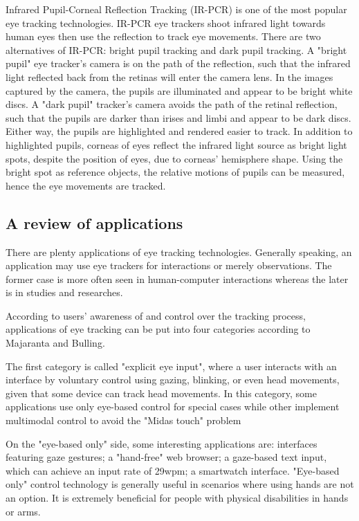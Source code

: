 \documentclass[english]{tktltiki}
\begin{document}
Infrared Pupil-Corneal Reflection Tracking (IR-PCR) is one of the most popular eye tracking technologies. IR-PCR eye trackers shoot infrared light towards human eyes then use the reflection to track eye movements. There are two alternatives of IR-PCR: bright pupil tracking and dark pupil tracking. A "bright pupil" eye tracker's camera is on the path of the reflection, such that the infrared light reflected back from the retinas will enter the camera lens. In the images captured by the camera, the pupils are illuminated and appear to be bright white discs. A "dark pupil" tracker's camera avoids the path of the retinal reflection, such that the pupils are darker than irises and limbi and appear to be dark discs. Either way, the pupils are highlighted and rendered easier to track. In addition to highlighted pupils, corneas of eyes reflect the infrared light source as bright light spots, despite the position of eyes, due to corneas' hemisphere shape. Using the bright spot as reference objects, the relative motions of pupils can be measured, hence the eye movements are tracked.


\subsection{A review of applications}

There are plenty applications of eye tracking technologies. Generally speaking, an application may use eye trackers for interactions or merely observations. The former case is more often seen in human-computer interactions whereas the later is in studies and researches. 

According to users' awareness of and control over the tracking process, applications of eye tracking can be put into four categories according to Majaranta and Bulling.\cite{majaranta14}

The first category is called "explicit eye input", where a user interacts with an interface by voluntary control using gazing, blinking, or even head movements, given that some device can track head movements. In this category, some applications use only eye-based control for special cases while other implement multimodal control to avoid the "Midas touch" problem \cite{Velichkovsky97}

On the "eye-based only" side, some interesting applications are: interfaces featuring gaze gestures\cite{Drewes:2007:ICU:1778331.1778385}\cite{Ohno:1998:FEG:786112.786297}; a "hand-free" web browser\cite{5090980}; a gaze-based text input\cite{wardmackay2002}, which can achieve an input rate of 29wpm; a smartwatch interface\cite{Hansen:2015:GIT:2800835.2804332}. "Eye-based only" control technology is generally useful in scenarios where using hands are not an option. It is extremely beneficial for people with physical disabilities in hands or arms. 
\end{document}
